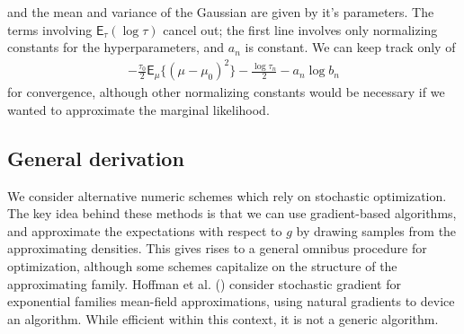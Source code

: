 \documentclass[
  11pt,
  letterpaper,
]{scrbook}
\theoremstyle{plain}
\theoremstyle{definition}
\theoremstyle{definition}
\theoremstyle{plain}
\theoremstyle{plain}
\theoremstyle{definition}
\theoremstyle{remark}
\begin{document}
and the mean and variance of the Gaussian are given by it's parameters.
The terms involving \(\mathsf{E}_{\tau}(\log \tau)\) cancel out; the
first line involves only normalizing constants for the hyperparameters,
and \(a_n\) is constant. We can keep track only of \begin{align*}
- \frac{\tau_0}{2} \mathsf{E}_{\mu}\{(\mu - \mu_0)^2\} - \frac{\log\tau_n}{2}-a_n\log b_n
\end{align*} for convergence, although other normalizing constants would
be necessary if we wanted to approximate the marginal likelihood.

\subsection{General derivation}\label{general-derivation}

We consider alternative numeric schemes which rely on stochastic
optimization. The key idea behind these methods is that we can use
gradient-based algorithms, and approximate the expectations with respect
to \(g\) by drawing samples from the approximating densities. This gives
rises to a general omnibus procedure for optimization, although some
schemes capitalize on the structure of the approximating family. Hoffman
et al. () consider stochastic gradient
for exponential families mean-field approximations, using natural
gradients to device an algorithm. While efficient within this context,
it is not a generic algorithm.
\end{document}
